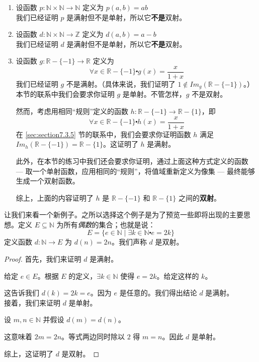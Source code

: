 \begin{example}
    \begin{enumerate}[label=(\alph*)]
        \item 设函数 $p:\mathbb{N} \times \mathbb{N} \to \mathbb{N}$ 定义为 $p(a, b) = ab$ \\
            我们已经证明 $p$ 是满射但不是单射，所以它\textbf{不是}双射。
        \item 设函数 $d:\mathbb{N} \times \mathbb{N} \to \mathbb{Z}$ 定义为 $d(a, b) = a-b$ \\
            我们已经证明 $d$ 是满射但不是单射，所以它\textbf{不是}双射。
        \item 设函数 $g : \mathbb{R} - \{-1\} \to \mathbb{R}$ 定义为 
             \[\forall x \in \mathbb{R} - \{-1\} \centerdot g(x) = \frac{x}{1+x}\]
             我们已经证明 $g$ 不是满射。（具体来说，我们证明了 $ 1 \notin Im_g(\mathbb{R} - \{-1\})$。）本节的联系中我们会要求你证明 $g$ 是单射。不管怎样，$g$ 不是双射。

             然而，考虑用相同``规则''定义的函数 $h : \mathbb{R} - \{-1\} \to \mathbb{R}- \{1\}$，即
             \[\forall x \in \mathbb{R} - \{-1\} \centerdot h(x) = \frac{x}{1+x}\]
             在 \ref{sec:section7.3.5} 节的联系中，我们会要求你证明函数 $h$ 满足 $Im_h(\mathbb{R} - \{-1\}) = \mathbb{R}- \{1\}$。这证明了 $h$ 是满射。

             此外，在本节的练习中我们还会要求你证明，通过上面这种方式定义的函数 --- 取一个单射函数，应用相同的``规则''，将值域重新定义为像集 --- 最终能够生成一个双射函数。

             综上，上面的内容证明了 $h$ 是 $\mathbb{R} - \{-1\}$ 和 $\mathbb{R}- \{1\}$ 之间的\textbf{双射}。
    \end{enumerate}
\end{example}

\begin{example}
    让我们来看一个新例子。之所以选择这个例子是为了预览一些即将出现的主要思想。定义 $E \subseteq \mathbb{N}$ 为所有\emph{偶数}的集合；也就是说：
    \[E = \{e \in \mathbb{N} \mid \exists k \in \mathbb{N} \centerdot e = 2k\}\]
    定义函数 $d : \mathbb{N} \to E$ 为 $d(n) = 2n$。我们声称 $d$ 是双射。

    \begin{proof}
        首先，我们来证明 $d$ 是满射。
        
        给定 $e \in E$。根据 $E$ 的定义，$\exists k \in \mathbb{N}$ 使得 $e = 2k$。给定这样的 $k$。

        这告诉我们 $d(k) = 2k = e$。因为 $e$ 是任意的。我们得出结论 $d$ 是满射。\\

        接着，我们来证明 $d$ 是单射。

        设 $m,n \in \mathbb{N}$ 并假设 $d(m) = d(n)$。

        这意味着 $2m=2n$。等式两边同时除以 $2$ 得 $m=n$。因此 $d$ 是单射。

        综上，这证明了 $d$ 是双射。
    \end{proof}
\end{example}

